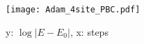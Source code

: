 \documentclass{article}
\begin{document}
\begin{figure}[!h]
	\centering
\texttt{[image: Adam\_4site\_PBC.pdf]}
	\caption{y: $\log\lvert E-E_0 \rvert$, x: steps}
	\label{fig:SGD_Adam_PBC}
\end{figure}







\end{document}
